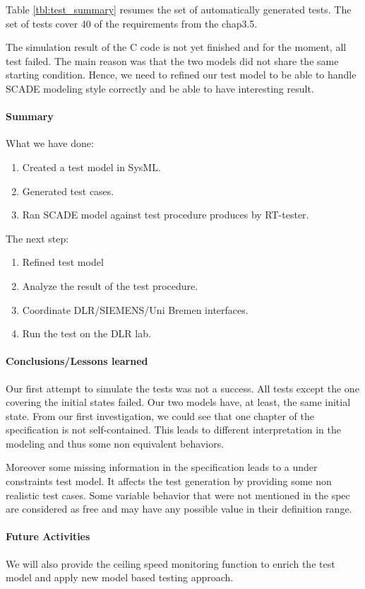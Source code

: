 Table \ref{tbl:test_summary} resumes the set of automatically
generated tests.
The set of tests cover 40 of the requirements from the chap3.5.


The simulation result of the C code is not yet finished and for the
moment, all test failed. The main reason was that the two
models did not share the same starting condition.
Hence, we  need to refined our test model to be able to handle SCADE
modeling style correctly and be able to have interesting result.



\paragraph{Summary}

What we have done:
\begin{enumerate}
\item Created a test model in SysML.
\item Generated test cases.
\item Ran SCADE model against test procedure produces by RT-tester.
\end{enumerate}
 
 The next step:
 \begin{enumerate}
 \item Refined test model
 \item Analyze the result of the test procedure.
 \item Coordinate DLR/SIEMENS/Uni Bremen interfaces.
 \item Run the test on the DLR lab.
 \end{enumerate}

\paragraph{Conclusions/Lessons learned}

Our first attempt to simulate the tests was not a success. All tests
except the one covering the initial states failed. Our two models
have, at least, the same initial state.
From  our first investigation, we could see that one chapter of
the specification is not self-contained. This leads to different
interpretation in the modeling and thus some non equivalent behaviors.

Moreover some missing information in the specification leads to a
under constraints test model. It affects the test generation by
providing some non realistic test cases. Some variable behavior that
were not mentioned in the spec are considered as free and may have any
possible value in their definition range.


\paragraph{Future Activities}
We will also provide the ceiling speed monitoring function to enrich
the test model and apply new model based testing approach.

%
%

